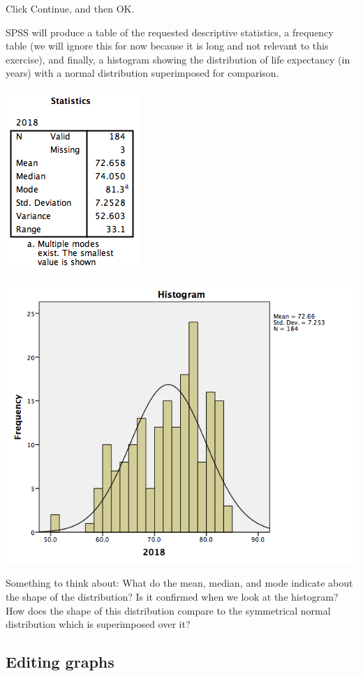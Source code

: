 \documentclass[
]{book}
\begin{document}
Click {Continue}, and then {OK}.

SPSS will produce a table of the requested descriptive statistics, a frequency table (we will ignore this for now because it is long and not relevant to this exercise), and finally, a histogram showing the distribution of life expectancy (in years) with a normal distribution superimposed for comparison.

\includegraphics{img/2.4.21.png}

\includegraphics{img/2.4.22.png}

Something to think about: What do the mean, median, and mode indicate about the shape of the distribution? Is it confirmed when we look at the histogram? How does the shape of this distribution compare to the symmetrical normal distribution which is superimposed over it?

\hypertarget{editing-graphs}{%
\subsection{Editing graphs}\label{editing-graphs}}
\end{document}
